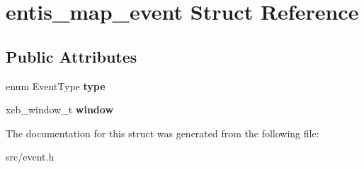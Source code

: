 \hypertarget{structentis__map__event}{}\section{entis\+\_\+map\+\_\+event Struct Reference}
\label{structentis__map__event}
\subsection*{Public Attributes}
\begin{DoxyCompactItemize}
\item 
\mbox{\label{structentis__map__event_a567316ed6832e2c4d9a991493082a76d}} 
enum Event\+Type {\bfseries type}
\item 
\mbox{\label{structentis__map__event_af31089ba27ac9e37a8c124b6e98848fb}} 
xcb\+\_\+window\+\_\+t {\bfseries window}
\end{DoxyCompactItemize}


The documentation for this struct was generated from the following file\+:\begin{DoxyCompactItemize}
\item 
src/event.\+h\end{DoxyCompactItemize}
